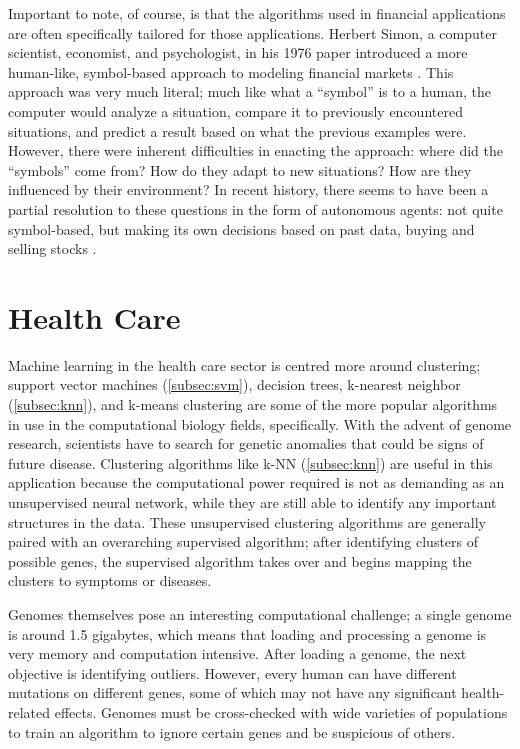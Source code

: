 \documentclass{comjnl}
\numberwithin{equation}{subsection}
\begin{document}
        Important to note, of course, is that the algorithms used in financial applications are
        often specifically tailored for those applications. Herbert Simon, a computer scientist,
        economist, and psychologist, in his 1976 paper introduced a more human-like, symbol-based
        approach to modeling financial markets \cite{simonh}. This approach was very much literal;
        much like what a ``symbol'' is to a human, the computer would analyze a situation, compare
        it to previously encountered situations, and predict a result based on what the previous
        examples were. However, there were inherent difficulties in enacting the approach: where did
        the ``symbols'' come from? How do they adapt to new situations? How are they influenced by
        their environment? In recent history, there seems to have been a partial resolution to these
        questions in the form of autonomous agents: not quite symbol-based, but making its own
        decisions based on past data, buying and selling stocks \cite{chens, calvacanter}.


    \section{Health Care}

        Machine learning in the health care sector is centred more around clustering; support vector
        machines (\ref{subsec:svm}), decision trees, k-nearest neighbor (\ref{subsec:knn}), and
        k-means clustering are some of the more popular algorithms in use in the computational
        biology fields, specifically. With the advent of genome research, scientists have to search
        for genetic anomalies that could be signs of future disease. Clustering algorithms like k-NN
        (\ref{subsec:knn}) are useful in this application because the computational power required
        is not as demanding as an unsupervised neural network, while they are still able to identify
        any important structures in the data. These unsupervised clustering algorithms are generally
        paired with an overarching supervised algorithm; after identifying clusters of possible
        genes, the supervised algorithm takes over and begins mapping the clusters to symptoms
        or diseases.

        Genomes themselves pose an interesting computational challenge; a single genome is around
        1.5 gigabytes, which means that loading and processing a genome is very memory and
        computation intensive. After loading a genome, the next objective is identifying outliers.
        However, every human can have different mutations on different genes, some of which may not
        have any significant health-related effects. Genomes must be cross-checked with wide
        varieties of populations to train an algorithm to ignore certain genes and be suspicious of
        others.
\end{document}
